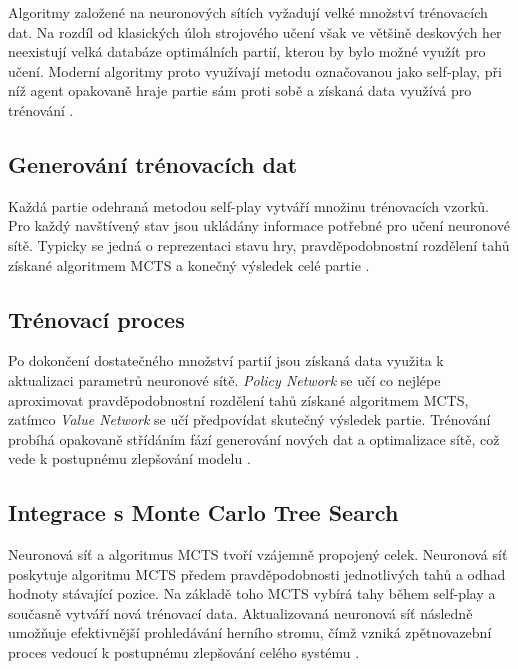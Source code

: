 Algoritmy založené na neuronových sítích vyžadují velké množství trénovacích dat. Na rozdíl od klasických úloh strojového učení však ve 
většině deskových her neexistují velká databáze optimálních partií, kterou by bylo možné využít pro učení. Moderní algoritmy proto 
využívají metodu označovanou jako self-play, při níž agent opakovaně hraje partie sám proti sobě a získaná data využívá pro 
trénování \cite{silver2017alphazero,sutton2018rl}.

\subsection{Generování trénovacích dat}

Každá partie odehraná metodou self-play vytváří množinu trénovacích vzorků. Pro každý navštívený stav jsou ukládány informace 
potřebné pro učení neuronové sítě. Typicky se jedná o reprezentaci stavu hry, pravděpodobnostní rozdělení tahů 
získané algoritmem MCTS a konečný výsledek celé partie \cite{silver2017alphazero}.

\subsection{Trénovací proces}

Po dokončení dostatečného množství partií jsou získaná data využita k aktualizaci parametrů neuronové sítě. \emph{Policy Network} 
se učí co nejlépe aproximovat pravděpodobnostní rozdělení tahů získané algoritmem MCTS, zatímco \emph{Value Network} se učí předpovídat 
skutečný výsledek partie. Trénování probíhá opakovaně střídáním fází generování nových dat a optimalizace sítě, což 
vede k postupnému zlepšování modelu \cite{silver2017alphazero}.

\subsection{Integrace s Monte Carlo Tree Search}

Neuronová síť a algoritmus MCTS tvoří vzájemně propojený celek. Neuronová síť poskytuje algoritmu MCTS předem pravděpodobnosti 
jednotlivých tahů a odhad hodnoty stávající pozice. Na základě toho MCTS vybírá tahy během self-play a současně vytváří 
nová trénovací data. Aktualizovaná neuronová síť následně umožňuje efektivnější prohledávání herního stromu, čímž vzniká zpětnovazební
proces vedoucí k postupnému zlepšování celého systému \cite{silver2017alphazero}.